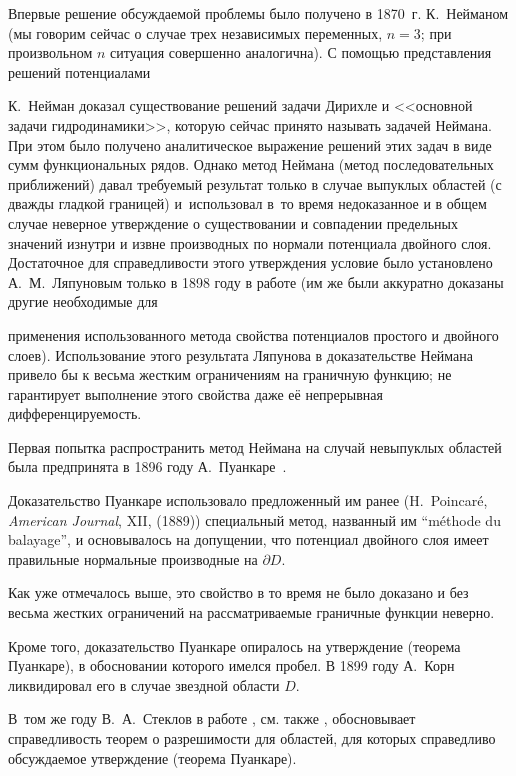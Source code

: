 Впервые решение обсуждаемой проблемы было получено в 1870~г. К.~Нейманом (мы говорим сейчас о случае трех независимых переменных, $n = 3$; при произвольном $n$ ситуация совершенно аналогична). С помощью представления решений потенциалами

К.~Нейман доказал существование решений задачи  Дирихле и <<основной задачи гидродинамики>>, которую сейчас принято называть задачей Неймана. При этом было получено аналитическое выражение решений этих задач в виде сумм функциональных рядов. Однако метод Неймана (метод последовательных приближений) давал требуемый результат только в случае выпуклых областей (с дважды гладкой границей) и~использовал в~то время недоказанное и в общем случае неверное утверждение о существовании и совпадении предельных значений изнутри  и извне  производных по нормали потенциала двойного слоя. Достаточное для справедливости этого утверждения условие было установлено А.~М.~Ляпуновым только в 1898 году в работе \cite{gushin:Liap} (им же были аккуратно доказаны другие необходимые для

применения использованного метода свойства потенциалов простого и двойного слоев). Использование этого результата Ляпунова в доказательстве Неймана привело бы к весьма жестким ограничениям на граничную функцию; не гарантирует выполнение этого свойства даже её непрерывная дифференцируемость.



Первая попытка распространить метод Неймана на случай невыпуклых областей была предпринята в 1896 году А.~Пуанкаре~\cite{gushin:Poincare}. %

Доказательство Пуанкаре использовало предложенный им ранее (H.~Poincar\'e, {\it American Journal}, XII, (1889)) специальный метод, названный им ``m\'ethode du balayage'', и основывалось на допущении, что потенциал двойного слоя имеет правильные нормальные производные на $\partial D$. 

Как уже отмечалось выше, это свойство в то время не было доказано и без весьма жестких ограничений на рассматриваемые граничные функции неверно. 

Кроме того, доказательство Пуанкаре опиралось на утверждение (теорема Пуанкаре), в обосновании которого имелся пробел. В 1899 году А.~Корн \cite{gushin:Korn} ликвидировал его в случае звездной области $D$. 

В~том же году В.~А.~Стеклов в работе  \cite{gushin:St5}, см. также \cite{gushin:St1}, обосновывает справедливость теорем о разрешимости для областей, для которых справедливо обсуждаемое утверждение (теорема Пуанкаре).  

